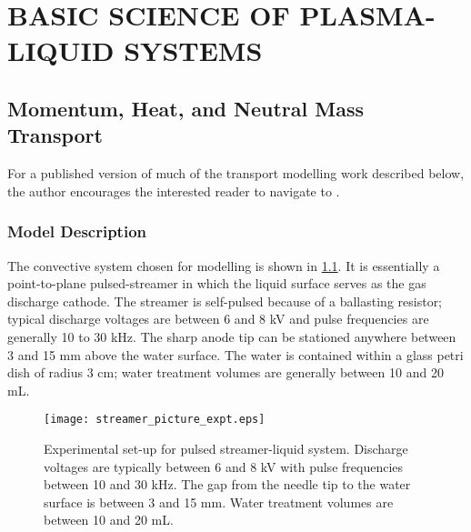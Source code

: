 \chapter{BASIC SCIENCE OF PLASMA-LIQUID SYSTEMS}
\label{chap:basic_science}

\section{Momentum, Heat, and Neutral Mass Transport}
\label{sec:plasfree_model}

For a published version of much of the transport modelling work described below, the author encourages the interested reader to navigate to \cite{lindsay2015momentum}.

\subsection{Model Description}

The convective system chosen for modelling is shown in \cref{fig:streamer_picture}. It is essentially a point-to-plane pulsed-streamer in which the liquid surface serves as the gas discharge cathode. The streamer is self-pulsed because of a ballasting resistor; typical discharge voltages are between 6 and 8 kV and pulse frequencies are generally 10 to 30 kHz. The sharp anode tip can be stationed anywhere between 3 and 15 mm above the water surface. The water is contained within a glass petri dish of radius 3 cm; water treatment volumes are generally between 10 and 20 mL.

\begin{figure}[htpb]
    \centering
        \texttt{[image: streamer\_picture\_expt.eps]}
    \caption{Experimental set-up for pulsed streamer-liquid system. Discharge voltages are typically between 6 and 8 kV with pulse frequencies between 10 and 30 kHz. The gap from the needle tip to the water surface is between 3 and 15 mm. Water treatment volumes are between 10 and 20 mL.}
    \label{fig:streamer_picture}
\end{figure}

